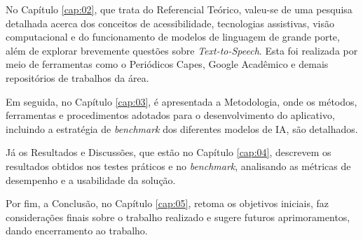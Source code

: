 No Capítulo \ref{cap:02}, que trata do Referencial Teórico, valeu-se de uma pesquisa detalhada acerca dos conceitos de acessibilidade, tecnologias assistivas, visão computacional e do funcionamento de modelos de linguagem de grande porte, além de explorar brevemente questões sobre \textit{Text-to-Speech}. Esta foi realizada por meio de ferramentas como o Periódicos Capes, Google Acadêmico e demais repositórios de trabalhos da área. 

Em seguida, no Capítulo \ref{cap:03}, é apresentada a Metodologia, onde os métodos, ferramentas e procedimentos adotados para o desenvolvimento do aplicativo, incluindo a estratégia de \textit{benchmark} dos diferentes modelos de IA, são detalhados. 

Já os Resultados e Discussões, que estão no Capítulo \ref{cap:04}, descrevem os resultados obtidos nos testes práticos e no \textit{benchmark}, analisando as métricas de desempenho e a usabilidade da solução. 

Por fim, a Conclusão, no Capítulo \ref{cap:05}, retoma os objetivos iniciais, faz considerações finais sobre o trabalho realizado e sugere futuros aprimoramentos, dando encerramento ao trabalho.

